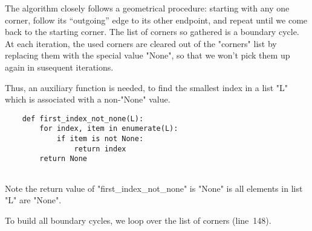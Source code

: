 The algorithm closely follows a geometrical procedure: starting with
any one corner, follow its ``outgoing'' edge to its other endpoint,
and repeat until we come back to the starting corner.  The list of
corners so gathered is a boundary cycle.  At each iteration, the used
corners are cleared out of the "corners" list by replacing them with
the special value "None", so that we won't pick them up again in
susequent iterations.

Thus, an auxiliary function is needed, to find the smallest index in a
list "L" which is associated with a non-"None" value.
\begin{lstlisting}
    def first_index_not_none(L):
        for index, item in enumerate(L):
            if item is not None:
                return index
        return None
    
\end{lstlisting}
Note the return value of "first_index_not_none" is "None" is all
elements in list "L" are "None".

To build all boundary cycles, we loop over the list of corners (line~148).

